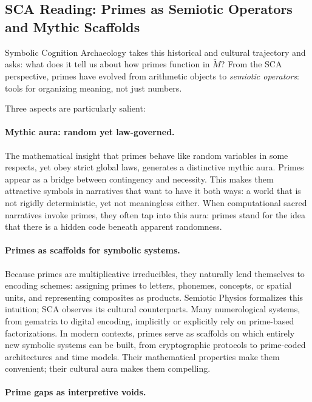 \documentclass[12]{amsart}
\theoremstyle{plain}
\begin{document}
\subsection{SCA Reading: Primes as Semiotic Operators and Mythic Scaffolds}

Symbolic Cognition Archaeology takes this historical and cultural trajectory and asks: what does it tell us about how primes function in $\tilde M$? From the SCA perspective, primes have evolved from arithmetic objects to \emph{semiotic operators}: tools for organizing meaning, not just numbers.

Three aspects are particularly salient:

\paragraph{Mythic aura: random yet law-governed.}

The mathematical insight that primes behave like random variables in some respects, yet obey strict global laws, generates a distinctive mythic aura. Primes appear as a bridge between contingency and necessity. This makes them attractive symbols in narratives that want to have it both ways: a world that is not rigidly deterministic, yet not meaningless either. When computational sacred narratives invoke primes, they often tap into this aura: primes stand for the idea that there is a hidden code beneath apparent randomness.

\paragraph{Primes as scaffolds for symbolic systems.}

Because primes are multiplicative irreducibles, they naturally lend themselves to encoding schemes: assigning primes to letters, phonemes, concepts, or spatial units, and representing composites as products. Semiotic Physics formalizes this intuition; SCA observes its cultural counterparts. Many numerological systems, from gematria to digital encoding, implicitly or explicitly rely on prime-based factorizations. In modern contexts, primes serve as scaffolds on which entirely new symbolic systems can be built, from cryptographic protocols to prime-coded architectures and time models. Their mathematical properties make them convenient; their cultural aura makes them compelling.

\paragraph{Prime gaps as interpretive voids.}
\end{document}
